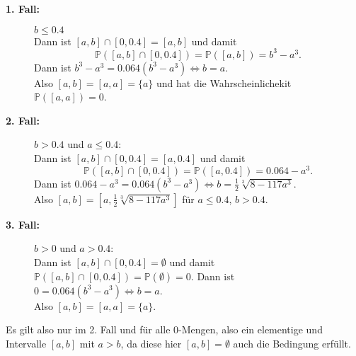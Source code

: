 \documentclass[11pt,a4paper,ngerman]{article}
\newcommand{\Prob}{\mathbb{P}}
\begin{document}
\begin{description}

    \item[\bfseries 1. Fall:] $b \leq 0.4$ \\
        Dann ist $[a,b] \cap [0,0.4] = [a,b]$ und damit
        \[
            \Prob([a,b] \cap [0,0.4]) = \Prob([a,b]) = b^3 - a^3.
        \]
        Dann ist $ b^3 - a^3 =  0.064 (b^3 - a^3) \Leftrightarrow b = a$. \\
        Also $[a,b] = [a,a] = \{a\}$ und hat die Wahrscheinlichekit $\Prob ([a,a]) = 0$. \\
    \item[\bfseries 2. Fall:] $b > 0.4$ und $a \leq 0.4$: \\
        Dann ist $[a,b] \cap [0,0.4] = [a, 0.4]$ und damit
        \[
            \Prob([a,b] \cap [0,0.4]) = \Prob([a,0.4]) = 0.064 - a^3.
        \]
        Dann ist $ 0.064 - a^3 =  0.064 (b^3 - a^3) \Leftrightarrow b = \frac{1}{2} \sqrt[3]{8-117a^3}$. \\
        Also $[a,b] = [a,\frac{1}{2} \sqrt[3]{8-117a^3}]$ für $a \leq 0.4$, $b > 0.4$. \\

    \item[\bfseries 3. Fall:] $b > 0$ und $ a > 0.4$: \\
        Dann ist $[a,b] \cap [0,0.4] = \emptyset$ und damit  $\Prob([a,b] \cap [0,0.4]) = \Prob(\emptyset) =0$.
        Dann ist $ 0=  0.064 (b^3 - a^3) \Leftrightarrow b = a$. \\
        Also $[a,b] = [a,a] = \{a\}$.\\
\end{description}

    Es gilt also nur im 2. Fall und für alle $0$-Mengen, also ein elementige und Intervalle $[a,b]$ mit $a>b$, da diese
    hier $[a,b] = \emptyset$ auch die Bedingung erfüllt.

\label{LastPage}
\end{document}
